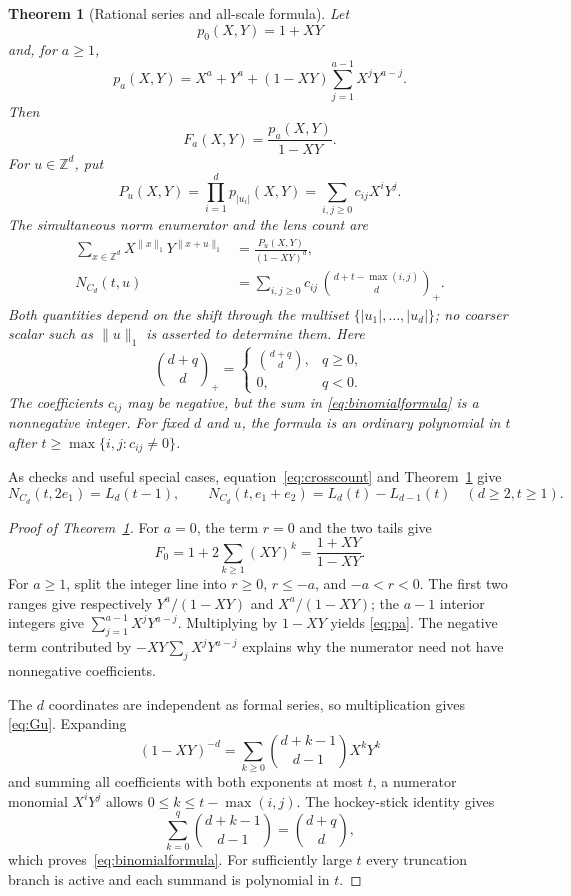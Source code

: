 \documentclass[pdflatex,sn-mathphys-num]{sn-jnl}
\theoremstyle{thmstyleone}
\newtheorem{theorem}{Theorem}[section]
\theoremstyle{thmstylethree}
\theoremstyle{thmstyletwo}
\newcommand{\Z}{\mathbb Z}
\begin{document}
\begin{appendices}
\begin{theorem}[Rational series and all-scale formula]
\label{thm:crossgf}
Let
\[
 p_0(X,Y)=1+XY
\]
and, for $a\ge1$,
\begin{equation}
 p_a(X,Y)=X^a+Y^a+(1-XY)\sum_{j=1}^{a-1}X^jY^{a-j}. \label{eq:pa}
\end{equation}
Then
\[
 F_a(X,Y)=\frac{p_a(X,Y)}{1-XY}.
\]
For $u\in\Z^d$, put
\[
 P_u(X,Y)=\prod_{i=1}^d p_{|u_i|}(X,Y)
          =\sum_{i,j\ge0}c_{ij}X^iY^j.
\]
The simultaneous norm enumerator and the lens count are
\begin{align}
 \sum_{x\in\Z^d}X^{\|x\|_1}Y^{\|x+u\|_1}
   &=\frac{P_u(X,Y)}{(1-XY)^d},               \label{eq:Gu}\\
 N_{C_d}(t,u)
   &=\sum_{i,j\ge0}c_{ij}\,
     \binom{d+t-\max(i,j)}d_{+}.              \label{eq:binomialformula}
\end{align}
Both quantities depend on the shift through the multiset
$\{|u_1|,\ldots,|u_d|\}$; no coarser scalar such as $\|u\|_1$ is asserted to
determine them.
Here
\[
 \binom{d+q}{d}_{+}=
 \begin{cases}\binom{d+q}{d},&q\ge0,\\0,&q<0.\end{cases}
\]
The coefficients $c_{ij}$ may be negative, but the sum in
\eqref{eq:binomialformula} is a nonnegative integer.  For fixed $d$ and $u$,
the formula is an ordinary polynomial in $t$ after
$t\ge\max\{i,j:c_{ij}\ne0\}$.
\end{theorem}

As checks and useful special cases, equation~\eqref{eq:crosscount} and
Theorem~\ref{thm:crossgf} give
\[
 N_{C_d}(t,2e_1)=L_d(t-1),\qquad
 N_{C_d}(t,e_1+e_2)=L_d(t)-L_{d-1}(t)
 \quad(d\ge2, t\ge1).
\]

\begin{proof}[Proof of Theorem~\ref{thm:crossgf}]
For $a=0$, the term $r=0$ and the two tails give
\[
 F_0=1+2\sum_{k\ge1}(XY)^k=\frac{1+XY}{1-XY}.
\]
For $a\ge1$, split the integer line into $r\ge0$, $r\le-a$, and
$-a<r<0$.  The first two ranges give respectively
$Y^a/(1-XY)$ and $X^a/(1-XY)$; the $a-1$ interior integers give
$\sum_{j=1}^{a-1}X^jY^{a-j}$.  Multiplying by $1-XY$ yields
\eqref{eq:pa}.  The negative term contributed by
$-XY\sum_jX^jY^{a-j}$ explains why the numerator need not have nonnegative
coefficients.

The $d$ coordinates are independent as formal series, so multiplication gives
\eqref{eq:Gu}.  Expanding
\[
 (1-XY)^{-d}=\sum_{k\ge0}\binom{d+k-1}{d-1}X^kY^k
\]
and summing all coefficients with both exponents at most $t$, a numerator
monomial $X^iY^j$ allows $0\le k\le t-\max(i,j)$.  The hockey-stick identity
gives
\[
 \sum_{k=0}^{q}\binom{d+k-1}{d-1}=\binom{d+q}{d},
\]
which proves~\eqref{eq:binomialformula}.  For sufficiently large $t$ every
truncation branch is active and each summand is polynomial in $t$.
\end{proof}


\end{appendices}
\end{document}
